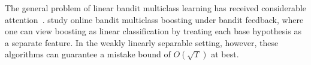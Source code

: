 

The general problem of linear bandit multiclass learning has received considerable attention~\cite{Abernethy-Rakhlin-2009, Wang-Jin-Valizadegan-2010,
Crammer-Gentile-2013, Hazan-Kale-2011, Beygelzimer-Orabona-Zhang-2017,
Foster-Kale-Luo-Mohri-Sridharan-2018}. \citet{Chen-Lin-Lu-2014,
Zhang-Jung-Tewari-2018} study online bandit multiclass boosting under bandit
feedback, where one can view boosting as linear classification by treating each
base hypothesis as a separate feature.  
In the weakly linearly separable setting, however, 
these algorithms can guarantee a mistake 
bound of ${O}(\sqrt{T})$ at best.


